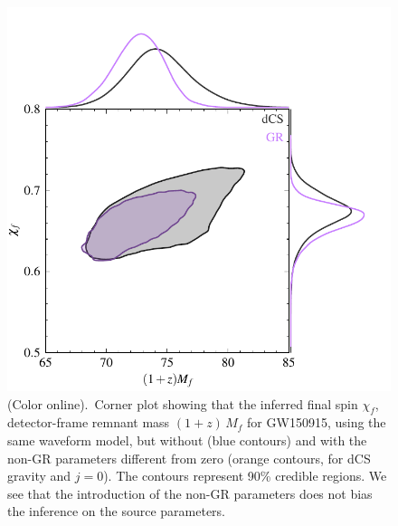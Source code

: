 \documentclass[twocolumn,
               prd,
               aps,
               superscriptaddress,
               tightenlines,
               nofootinbib,
               eqsecnum,
               amsfonts,
               amsmath,
               longbibliography]{revtex4-1}
\begin{document}
\begin{figure}[t]
\includegraphics[width=0.9\columnwidth]{figs/tmp_GW150914_intrinsic_params_remnant.pdf}
\caption{(Color online).~Corner plot showing that the inferred final spin $\chi_f$,
detector-frame remnant mass $(1 + z) \, M_f$ for GW150915, using the same waveform model,
but without (blue contours) and with the non-GR parameters different from zero (orange contours, for
dCS gravity and $j=0$). The contours represent 90\% credible regions.
%
We see that the introduction of the non-GR parameters does not bias the
inference on the source parameters.
}
\label{fig:corner_plot}
\end{figure}
\end{document}
